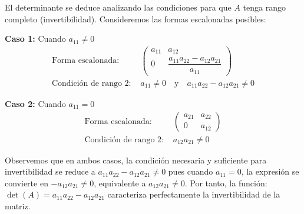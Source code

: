 \begin{rem}[Fundamentación]
El determinante se deduce analizando las condiciones para que \(A\) tenga rango completo (invertibilidad). Consideremos las formas escalonadas posibles:

\noindent
\textbf{Caso 1:} Cuando \(a_{11} \neq 0\)
\begin{align*}
\text{Forma escalonada: } &
\begin{pmatrix}
a_{11} & a_{12} \\
0 & \dfrac{a_{11}a_{22} - a_{12}a_{21}}{a_{11}}
\end{pmatrix} \\
\text{Condición de rango 2: } & a_{11} \neq 0 \quad \text{y} \quad a_{11}a_{22} - a_{12}a_{21} \neq 0
\end{align*}

\noindent
\textbf{Caso 2:} Cuando \(a_{11} = 0\)
\begin{align*}
\text{Forma escalonada: } & 
\begin{pmatrix}
a_{21} & a_{22} \\
0 & a_{12}
\end{pmatrix} \\
\text{Condición de rango 2: } & a_{12}a_{21} \neq 0
\end{align*}

\noindent
Observemos que en ambos casos, la condición necesaria y suficiente para invertibilidad se reduce a \(
a_{11}a_{22} - a_{12}a_{21} \neq 0
\) pues cuando \(a_{11} = 0\), la expresión se convierte en \(-a_{12}a_{21} \neq 0\), equivalente a \(a_{12}a_{21} \neq 0\). Por tanto, la función:
\(\det(A) = a_{11}a_{22} - a_{12}a_{21}
\) caracteriza perfectamente la invertibilidad de la matriz.
\end{rem}

